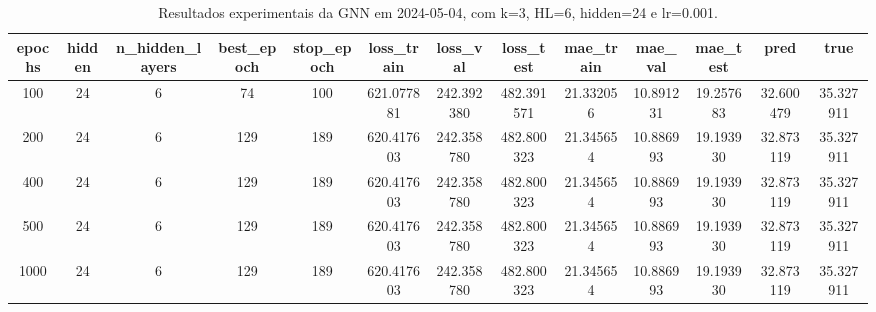 \begin{table}[h]
\centering
\caption{Resultados experimentais da GNN em 2024-05-04, com k=3, HL=6, hidden=24 e lr=0.001.}
\label{tab:gnn_results_k3_hl6_h24_d20240504}
\begin{tabular}{ccccccccccccc}
\toprule
epochs & hidden & n\_hidden\_layers & best\_epoch & stop\_epoch & loss\_train & loss\_val & loss\_test & mae\_train & mae\_val & mae\_test & pred & true \\
\midrule
100 & 24 & 6 & 74 & 100 & 621.077881 & 242.392380 & 482.391571 & 21.332056 & 10.891231 & 19.257683 & 32.600479 & 35.327911 \\
200 & 24 & 6 & 129 & 189 & 620.417603 & 242.358780 & 482.800323 & 21.345654 & 10.886993 & 19.193930 & 32.873119 & 35.327911 \\
400 & 24 & 6 & 129 & 189 & 620.417603 & 242.358780 & 482.800323 & 21.345654 & 10.886993 & 19.193930 & 32.873119 & 35.327911 \\
500 & 24 & 6 & 129 & 189 & 620.417603 & 242.358780 & 482.800323 & 21.345654 & 10.886993 & 19.193930 & 32.873119 & 35.327911 \\
1000 & 24 & 6 & 129 & 189 & 620.417603 & 242.358780 & 482.800323 & 21.345654 & 10.886993 & 19.193930 & 32.873119 & 35.327911 \\
\bottomrule
\end{tabular}
\end{table}
